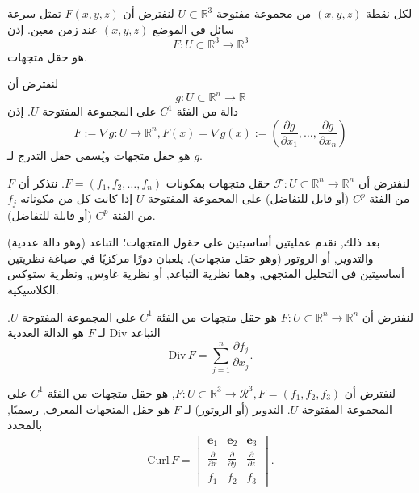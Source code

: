 \begin{exemple}

لكل نقطة \((x, y, z)\) من مجموعة مفتوحة \( U \subset \mathbb{R}^3 \) لنفترض أن \( F(x, y, z) \) تمثل سرعة سائل في الموضع \((x, y, z)\) عند زمن معين. إذن
\[ 
F : U \subset \mathbb{R}^3 \to \mathbb{R}^3 
\]
هو حقل متجهات.
\end{exemple}

\begin{exemple}

لنفترض أن
\[ g : U \subset \mathbb{R}^n \to \mathbb{R} \]
دالة من الفئة \( C^1 \) على المجموعة المفتوحة \( U \). إذن
\[ F := \nabla g : U \to \mathbb{R}^n, F(x) = \nabla g(x) := \left( \frac{\partial g}{\partial x_1}, \ldots, \frac{\partial g}{\partial x_n} \right) \]
هو حقل متجهات ويُسمى حقل التدرج لـ \( g \).
\end{exemple}

\begin{definition}
 
لنفترض أن \( \mathcal{F} : U \subset \mathbb{R}^n \to \mathbb{R}^n \) حقل متجهات بمكونات \( F = (f_1, f_2, \ldots, f_n) \). نتذكر أن \( F \) من الفئة \( C^p \) (أو قابل للتفاضل) على المجموعة المفتوحة \( U \) إذا كانت كل من مكوناته \( f_j \) من الفئة \( C^p \) (أو قابلة للتفاضل).
\end{definition}

بعد ذلك, نقدم عمليتين أساسيتين على حقول المتجهات؛ التباعد (وهو دالة عددية) والتدوير, أو الروتور (وهو حقل متجهات). يلعبان دورًا مركزيًا في صياغة نظريتين أساسيتين في التحليل المتجهي, وهما نظرية التباعد, أو نظرية غاوس, ونظرية ستوكس الكلاسيكية.  

\begin{definition}
لنفترض أن \( F : U \subset \mathbb{R}^n \to \mathbb{R}^n \) هو حقل متجهات من الفئة \( C^1 \) على المجموعة المفتوحة \( U \). التباعد \( \text{Div} \) لـ \( F \) هو الدالة العددية
\[ \text{Div} \, F = \sum_{j=1}^{n} \frac{\partial f_j}{\partial x_j}. \]
\end{definition}

\begin{definition}
لنفترض أن \( F : U \subset \mathbb{R}^3 \to \mathcal{R}^3, F = (f_1, f_2, f_3) \), هو حقل متجهات من الفئة \( C^1 \) على المجموعة المفتوحة \( U \). التدوير (أو الروتور) لـ \( F \) هو حقل المتجهات المعرف, رسميًا, بالمحدد
\begin{eqnarray*}
    \text{Curl} \, F = \begin{vmatrix} \mathbf{e}_1 & \mathbf{e}_2 & \mathbf{e}_3 \\ \frac{\partial}{\partial x} & \frac{\partial}{\partial y} & \frac{\partial}{\partial z} \\ 
    f_1 & f_2 & f_3 \end{vmatrix}. 
\end{eqnarray*}
\end{definition}

